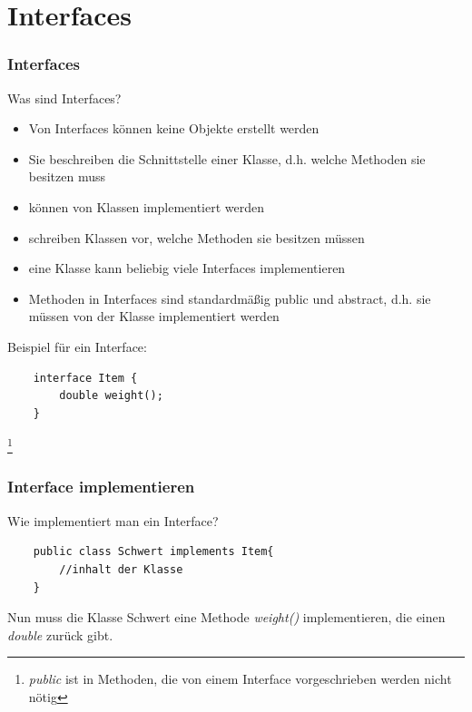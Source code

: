 \section{Interfaces}

\begin{frame}[fragile] %
\frametitle{Interfaces}
Was sind Interfaces?
\begin{itemize}
    \item Von Interfaces können keine Objekte erstellt werden
    \item Sie beschreiben die Schnittstelle einer Klasse, d.h. welche Methoden sie besitzen muss
    \item können von Klassen implementiert werden
    \item schreiben Klassen vor, welche Methoden sie besitzen müssen
    \item eine Klasse kann beliebig viele Interfaces implementieren
    \item Methoden in Interfaces sind standardmäßig public und abstract, d.h. sie müssen von der Klasse implementiert werden
\end{itemize}
Beispiel für ein Interface:
\begin{lstlisting}
    interface Item {
        double weight();
    }
\end{lstlisting}\footnote{\textit{public} ist in Methoden, die von einem Interface vorgeschrieben werden nicht nötig}
\end{frame}

\begin{frame}[fragile]
\frametitle{Interface implementieren}
Wie implementiert man ein Interface?
\begin{lstlisting}
    public class Schwert implements Item{
        //inhalt der Klasse
    }
\end{lstlisting}
Nun muss die Klasse Schwert eine Methode \textit{weight()} implementieren, die einen \textit{double} zurück gibt.
\end{frame}

